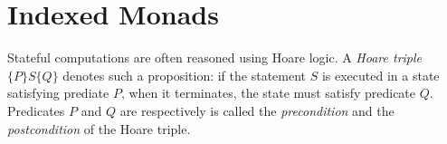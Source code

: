 \newcommand{\framedhslinecorrect}[2]%
  {#1[#2]}

\newcommand{\framedhs}{\sethscode{framedhscode}}


\newenvironment{inlinehscode}%
  {\(\def\column##1##2{}%
   \let\>\undefined\let\<\undefined\let\\\undefined
   \newcommand\>[1][]{}\newcommand\<[1][]{}\newcommand\\[1][]{}%
   \def\fromto##1##2##3{##3}%
   \def\nextline{}}{\) }%

\newcommand{\inlinehs}{\sethscode{inlinehscode}}


\newenvironment{joincode}%
  {\let\orighscode=\hscode
   \let\origendhscode=\endhscode
   \def\endhscode{\def\hscode{\endgroup\def\@currenvir{hscode}\\}\begingroup}
   \orighscode\def\hscode{\endgroup\def\@currenvir{hscode}}}%
  {\origendhscode
   \global\let\hscode=\orighscode
   \global\let\endhscode=\origendhscode}%

\makeatother
\EndFmtInput
%

%
\makeatletter

\let\Varid\mathit
\let\Conid\mathsf

\def\commentbegin{\quad\{\ }
\def\commentend{\}}

\newcommand{\ty}[1]{\Conid{#1}}
\newcommand{\con}[1]{\Conid{#1}}
\newcommand{\id}[1]{\Varid{#1}}
\newcommand{\cl}[1]{\Varid{#1}}
\newcommand{\opsym}[1]{\mathrel{#1}}

\newcommand\Keyword[1]{\textbf{\textsf{#1}}}
\newcommand\Hide{\mathbin{\downarrow}}
\newcommand\Reveal{\mathbin{\uparrow}}




\makeatother
\EndFmtInput

\section{Indexed Monads}
\label{sec:indexed-monads}

Stateful computations are often reasoned using Hoare logic. A {\em Hoare triple}
$\{P\} S \{Q\}$ denotes such a proposition: if the statement $S$ is executed in
a state satisfying prediate $P$, when it terminates, the state must satisfy
predicate $Q$. Predicates $P$ and $Q$ are respectively is called the
\emph{precondition} and the \emph{postcondition} of the Hoare triple.

